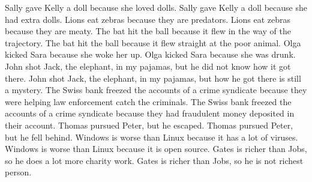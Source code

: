 \documentclass{article}
\begin{document}
\begin{enumerate}
	Sally gave Kelly a doll because she loved dolls.
	Sally gave Kelly a doll because she had extra dolls.
	Lions eat zebras because they are predators.
	Lions eat zebras because they are meaty.
	The bat hit the ball because it flew in the way of the trajectory.
	The bat hit the ball because it flew straight at the poor animal.
	Olga kicked Sara because she woke her up.
	Olga kicked Sara because she was drunk.
	John shot Jack, the elephant, in my pajamas, but he did not know how it got there.
	John shot Jack, the elephant, in my pajamas, but how he got there is still a mystery.
	The Swiss bank freezed the accounts of a crime syndicate because they were helping law enforcement catch the criminals.
	The Swiss bank freezed the accounts of a crime syndicate because they had fraudulent money deposited in their account.
	Thomas pursued Peter, but he escaped.
	Thomas pursued Peter, but he fell behind.
	Windows is worse than Linux because it has a lot of viruses.
	Windows is worse than Linux because it is open source.
	Gates is richer than Jobs, so he does a lot more charity work.
	Gates is richer than Jobs, so he is not richest person.
\end{enumerate}
\end{document}
